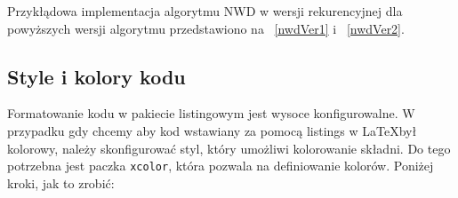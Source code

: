 Przykłądowa implementacja algorytmu NWD w wersji rekurencyjnej dla powyższych wersji algorytmu przedstawiono na \listingname~\ref{nwdVer1} i ~\ref{nwdVer2}.







\subsection{Style i kolory kodu}

Formatowanie kodu w pakiecie listingowym jest wysoce konfigurowalne. W przypadku gdy chcemy aby kod wstawiany za pomocą listings w \LaTeX był kolorowy, należy skonfigurować styl, który umożliwi kolorowanie składni. Do tego potrzebna jest paczka \texttt{xcolor}, która pozwala na definiowanie kolorów. Poniżej kroki, jak to zrobić:

